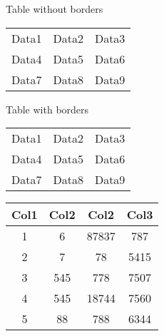 \documentclass{article}
\begin{document}
\begin{center}
Table without borders\\
\begin{tabular}{ c c c }
Data1 & Data2 & Data3 \\
Data4 & Data5 & Data6 \\
Data7 & Data8 & Data9 

\end{tabular}
\end{center}

\vspace{1cm}


\begin{center}
Table with borders\\
\begin{tabular}{ c | c | c }
\hline
Data1 & Data2 & Data3 \\
Data4 & Data5 & Data6 \\
Data7 & Data8 & Data9 \\

\hline
\end{tabular}
\end{center}
\vspace{1cm}



\begin{center}
 \begin{tabular}{||c | c | c | c||} 
 \hline
 Col1 & Col2 & Col2 & Col3 \\ [0.5ex] 
 \hline\hline
 1 & 6 & 87837 & 787 \\ 
 \hline
 2 & 7 & 78 & 5415 \\
 \hline
 3 & 545 & 778 & 7507 \\
 \hline
 4 & 545 & 18744 & 7560 \\
 \hline
 5 & 88 & 788 & 6344 \\ [1ex] 
 \hline
\end{tabular}
\end{center}
\end{document}
